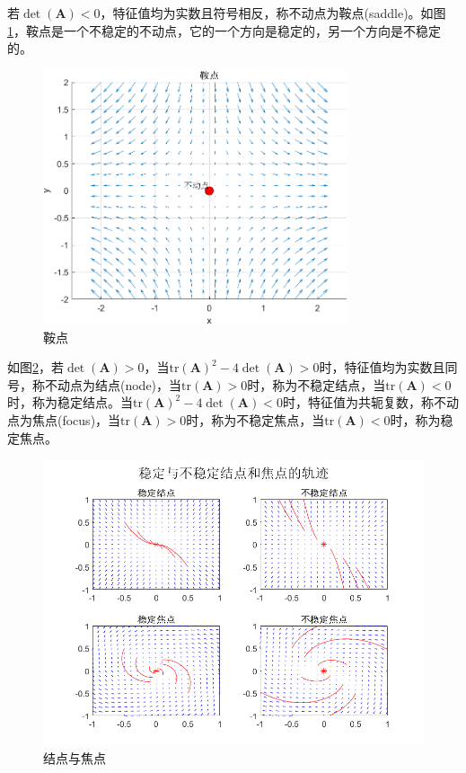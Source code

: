 若$\det(\mathbf{A})<0$，特征值均为实数且符号相反，称不动点为鞍点(saddle)。如图\ref{fig:saddle}，鞍点是一个不稳定的不动点，它的一个方向是稳定的，另一个方向是不稳定的。
\begin{figure}[H]
    \centering
    \includegraphics[width=0.8\textwidth]{Img/saddle.png}
    \caption{鞍点}
    \label{fig:saddle}
\end{figure}

如图\ref{fig:node}，若$\det(\mathbf{A})>0$，当$\text{tr}(\mathbf{A})^2-4\det(\mathbf{A})>0$时，特征值均为实数且同号，称不动点为结点(node)，当$\text{tr}(\mathbf{A})>0$时，称为不稳定结点，当$\text{tr}(\mathbf{A})<0$时，称为稳定结点。当$\text{tr}(\mathbf{A})^2-4\det(\mathbf{A})<0$时，特征值为共轭复数，称不动点为焦点(focus)，当$\text{tr}(\mathbf{A})>0$时，称为不稳定焦点，当$\text{tr}(\mathbf{A})<0$时，称为稳定焦点。
\begin{figure}[H]
    \centering
    \includegraphics[width=.7\linewidth]{Img/node.png}
    \caption{结点与焦点}
    \label{fig:node}
\end{figure}

